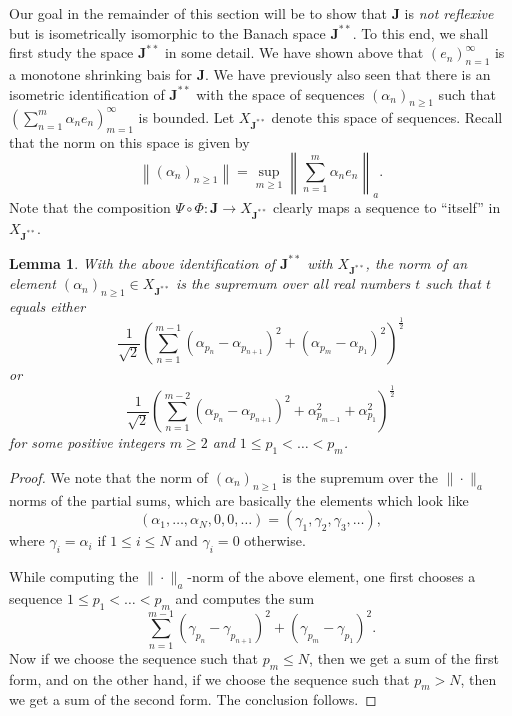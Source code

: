 \documentclass[11pt]{article}
\theoremstyle{thmstyle}
\newtheorem{lemma}[theorem]{Lemma}
\theoremstyle{defstyle}
\renewcommand{\le}{\leqslant}
\renewcommand{\ge}{\geqslant}
\newcommand{\bfJ}{\mathbf{J}}
\begin{document}
Our goal in the remainder of this section will be to show that $\bfJ$ is \emph{not reflexive} but is isometrically isomorphic to the Banach space $\bfJ^{\ast\ast}$. To this end, we shall first study the space $\bfJ^{\ast\ast}$ in some detail. We have shown above that $(e_n)_{n = 1}^\infty$ is a monotone shrinking bais for $\bfJ$. We have previously also seen that there is an isometric identification of $\bfJ^{\ast\ast}$ with the space of sequences $(\alpha_n)_{n\ge 1}$ such that $\displaystyle\left(\sum_{n = 1}^m \alpha_n e_n\right)_{m = 1}^\infty$ is bounded. Let $X_{\bfJ^{\ast\ast}}$ denote this space of sequences. Recall that the norm on this space is given by 
\begin{equation*}
	\left\|(\alpha_n)_{n\ge 1}\right\| = \sup_{m\ge 1}\left\|\sum_{n =1 }^m \alpha_n e_n\right\|_a.
\end{equation*}
Note that the composition $\Psi\circ\Phi\colon \bfJ\to X_{\bfJ^{\ast\ast}}$ clearly maps a sequence to ``itself'' in $X_{\bfJ^{\ast\ast}}$. 

\begin{lemma}
	With the above identification of $\bfJ^{\ast\ast}$ with $X_{\bfJ^{\ast\ast}}$, the norm of an element $(\alpha_n)_{n\ge 1}\in X_{\bfJ^{\ast\ast}}$ is the supremum over all real numbers $t$ such that $t$ equals either 
	\begin{equation*}
		\frac{1}{\sqrt 2}\left(\sum_{n = 1}^{m - 1}(\alpha_{p_n} - \alpha_{p_{n + 1}})^2 + (\alpha_{p_m} - \alpha_{p_1})^2\right)^{\frac{1}{2}}
	\end{equation*}
	or 
	\begin{equation*}
		\frac{1}{\sqrt 2}\left(\sum_{n = 1}^{m - 2}(\alpha_{p_n} - \alpha_{p_{n + 1}})^2 + \alpha_{p_{m - 1}}^2 + \alpha_{p_1}^2\right)^{\frac{1}{2}}
	\end{equation*}
	for some positive integers $m\ge 2$ and $1\le p_1 < \dots < p_m$.
\end{lemma}
\begin{proof}
	We note that the norm of $(\alpha_n)_{n\ge 1}$ is the supremum over the $\|\cdot\|_a$ norms of the partial sums, which are basically the elements which look like 
	\begin{equation*}
		\left(\alpha_1, \dots, \alpha_N, 0, 0, \dots\right) = (\gamma_1, \gamma_2, \gamma_3,\dots),
	\end{equation*}
	where $\gamma_i = \alpha_i$ if $1\le i\le N$ and $\gamma_i = 0$ otherwise.  
	
	While computing the $\|\cdot\|_a$-norm of the above element, one first chooses a sequence $1\le p_1 < \dots < p_m$ and computes the sum 
	\begin{equation*}
		\sum_{n = 1}^{m - 1}(\gamma_{p_n} - \gamma_{p_{n + 1}})^2 + (\gamma_{p_m} - \gamma_{p_1})^2.
	\end{equation*}
	Now if we choose the sequence such that $p_m\le N$, then we get a sum of the first form, and on the other hand, if we choose the sequence such that $p_m > N$, then we get a sum of the second form. The conclusion follows.
\end{proof}
\end{document}
